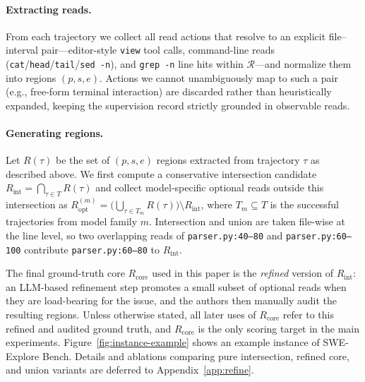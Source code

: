\paragraph{Extracting reads.} From each trajectory we collect all read actions that resolve to an explicit file--interval pair---editor-style \texttt{view} tool calls, command-line reads (\texttt{cat}/\texttt{head}/\texttt{tail}/\texttt{sed -n}), and \texttt{grep -n} line hits within $\mathcal{R}$---and normalize them into regions $(p, s, e)$. Actions we cannot unambiguously map to such a pair (e.g., free-form terminal interaction) are discarded rather than heuristically expanded, keeping the supervision record strictly grounded in observable reads.



\paragraph{Generating regions.}\label{sec:core-opt}
Let $R(\tau)$ be the set of $(p, s, e)$ regions extracted from trajectory $\tau$ as described above. We first compute a conservative intersection candidate $R_{\text{int}} = \bigcap_{\tau \in T} R(\tau)$ and collect model-specific optional reads outside this intersection as $R_{\text{opt}}^{(m)} = \bigl(\bigcup_{\tau \in T_m} R(\tau)\bigr) \setminus R_{\text{int}}$, where $T_m \subseteq T$ is the successful trajectories from model family $m$. Intersection and union are taken file-wise at the line level, so two overlapping reads of \texttt{parser.py:40--80} and \texttt{parser.py:60--100} contribute \texttt{parser.py:60--80} to $R_{\text{int}}$.

The final ground-truth core $R_{\text{core}}$ used in this paper is the \emph{refined} version of $R_{\text{int}}$: an LLM-based refinement step promotes a small subset of optional reads when they are load-bearing for the issue, and the authors then manually audit the resulting regions. Unless otherwise stated, all later uses of $R_{\text{core}}$ refer to this refined and audited ground truth, and $R_{\text{core}}$ is the only scoring target in the main experiments. Figure~\ref{fig:instance-example} shows an example instance of SWE-Explore Bench. Details and ablations comparing pure intersection, refined core, and union variants are deferred to Appendix~\ref{app:refine}.




















